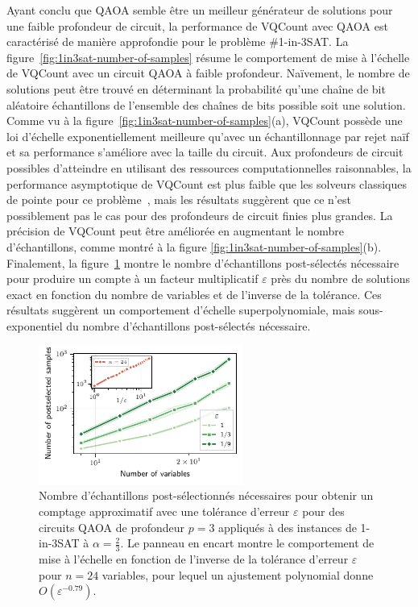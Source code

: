 Ayant conclu que QAOA semble être un meilleur générateur de solutions pour une faible profondeur de circuit, la performance de VQCount avec QAOA est caractérisé de manière approfondie pour le problème \#1-in-3SAT. La figure~\ref{fig:1in3sat-number-of-samples} résume le comportement de mise à l'échelle de VQCount avec un circuit QAOA à faible profondeur. Naïvement, le nombre de solutions peut être trouvé en déterminant la probabilité qu'une chaîne de bit aléatoire échantillons de l'ensemble des chaînes de bits possible soit une solution. Comme vu à la figure~\ref{fig:1in3sat-number-of-samples}(a), VQCount possède une loi d'échelle exponentiellement meilleure qu'avec un échantillonnage par rejet naïf et sa performance s'améliore avec la taille du circuit. Aux profondeurs de circuit possibles d'atteindre en utilisant des ressources computationnelles raisonnables, la performance asymptotique de VQCount est plus faible que les solveurs classiques de pointe pour ce problème~\cite{kourtisFastCountingTensor2019}, mais les résultats suggèrent que ce n'est possiblement pas le cas pour des profondeurs de circuit finies plus grandes. La précision de VQCount peut être améliorée en augmentant le nombre d'échantillons, comme montré à la figure \ref{fig:1in3sat-number-of-samples}(b). Finalement, la figure~\ref{fig:1in3sat-scaling} montre le nombre d'échantillons post-sélectés nécessaire pour produire un compte à un facteur multiplicatif $\varepsilon$ près du nombre de solutions exact en fonction du nombre de variables et de l'inverse de la tolérance. Ces résultats suggèrent un comportement d'échelle superpolynomiale, mais sous-exponentiel du nombre d'échantillons post-sélectés nécessaire. 


\begin{figure}[H]
    \centering
    \includegraphics[width=0.6\textwidth]{figures/1in3sat-scaling.pdf}
    \caption[Comportement d'échelle du nombre d'échantillons post-sélectés pour \#1-in-3SAT]{Nombre d'échantillons post-sélectionnés nécessaires pour obtenir un comptage approximatif avec une tolérance d'erreur $\varepsilon$ pour des circuits QAOA de profondeur $p=3$ appliqués à des instances de 1-in-3SAT à $\alpha=\frac{2}{3}$. Le panneau en encart montre le comportement de mise à l'échelle en fonction de l'inverse de la tolérance d'erreur $\varepsilon$ pour $n=24$ variables, pour lequel un ajustement polynomial donne $O(\varepsilon^{-0.79})$.}
    \label{fig:1in3sat-scaling}
\end{figure}


